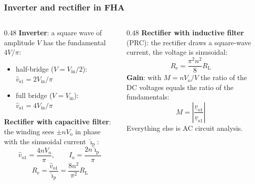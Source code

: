 \begin{frame}
	\frametitle{Inverter and rectifier in FHA}
	\begin{columns}[T]
		\begin{column}{0.48\textwidth}
			\small
			\textbf{Inverter}: a square wave of amplitude $V$ has the fundamental $4V/\pi$:
			\begin{itemize}
				\item half-bridge ($V=V_\mathrm{in}/2$): $\hat{v}_\mathrm{s1}=2V_\mathrm{in}/\pi$
				\item full bridge ($V=V_\mathrm{in}$): $\hat{v}_\mathrm{s1}=4V_\mathrm{in}/\pi$
			\end{itemize}
			\textbf{Rectifier with capacitive filter}: the winding sees $\pm nV_\mathrm{o}$ in phase with the sinusoidal current $\hat{\imath}_\mathrm{p}$:
			\begin{equation*}
				\hat{v}_\mathrm{o1}=\frac{4nV_\mathrm{o}}{\pi},\qquad I_\mathrm{o}=\frac{2n\hat{\imath}_\mathrm{p}}{\pi}
			\end{equation*}
			\begin{equation*}
				R_\mathrm{e}=\frac{\hat{v}_\mathrm{o1}}{\hat{\imath}_\mathrm{p}}=\frac{8n^2}{\pi^2}R_\mathrm{L}
			\end{equation*}
		\end{column}
		\begin{column}{0.48\textwidth}
			\small
			\textbf{Rectifier with inductive filter} (PRC): the rectifier draws a square-wave current, the voltage is sinusoidal:
			\begin{equation*}
				R_\mathrm{e}=\frac{\pi^2n^2}{8}R_\mathrm{L}
			\end{equation*}
			\textbf{Gain}: with $M=nV_\mathrm{o}/V$ the ratio of the DC voltages equals the ratio of the fundamentals:
			\begin{equation*}
				M=\left|\frac{\underline{v}_\mathrm{o1}}{\underline{v}_\mathrm{s1}}\right|
			\end{equation*}
			Everything else is AC circuit analysis.
		\end{column}
	\end{columns}
\end{frame}

